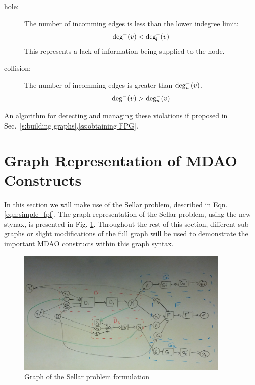   \begin{description}
    \item[hole: ] The number of incomming edges is less than the lower indegree limit:
      \begin{equation} \textrm{deg}^-(v) < \textrm{deg}_l^-(v) \label{e:hole} \end{equation}
      This represents a lack of information being supplied to the node.
    \item[collision: ] The number of incomming edges is greater than $ \textrm{deg}_u^-(v)$. 
      \begin{equation} \textrm{deg}^-(v) > \textrm{deg}_u^-(v) \label{e:collision}\end{equation}
  \end{description} 

  An algorithm for detecting and managing these violations if proposed in Sec.~\ref{s:building graphs}.\ref{ss:obtaining FPG}.

\section{Graph Representation of MDAO Constructs}
\label{s:graph representation}
In this section we will make use of the Sellar problem, described in 
Eqn. \ref{eqn:simple_fpf}. The graph representation of the Sellar problem, 
using the new stynax, is presented in Fig. \ref{f:sellar_graph_full}. Throughout
the rest of this section, different sub-graphs or slight modifications of 
the full graph will be used to demonstrate the important MDAO constructs within
this graph syntax.

\begin{figure}[htb!]
    \begin{center}
    \includegraphics[width=4in]{images/sellar_graph_full}
    \end{center}
    \vspace{-10pt}
\caption{Graph of the Sellar problem formulation}
\label{f:sellar_graph_full}
\end{figure}


